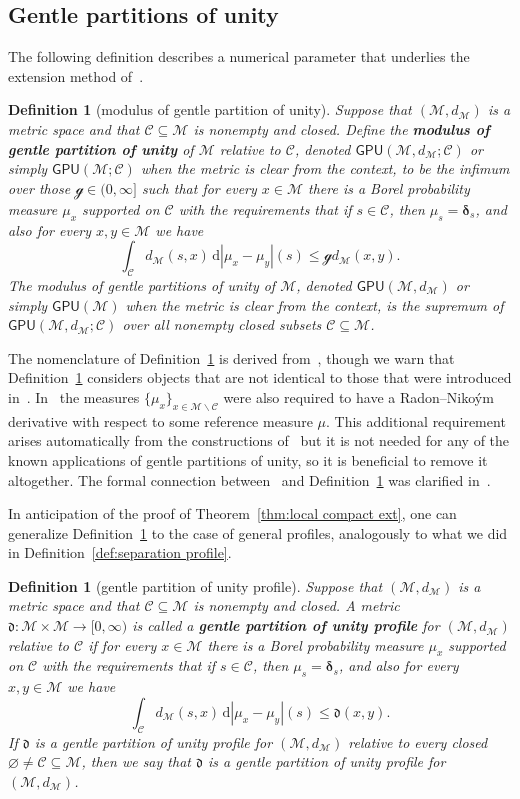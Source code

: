 \documentclass[11pt,reqno]{amsart}
\renewcommand{\le}{\leqslant}
\renewcommand{\setminus}{\smallsetminus}
\newcommand{\ud}[0]{\,\mathrm{d}}
\newcommand{\bd}{\boldsymbol{\delta}}
\renewcommand{\bd}{\boldsymbol{\delta}}
\newtheorem{definition}[theorem]{Definition}
\theoremstyle{remark}
\newcommand{\MM}{\mathcal{M}}
\renewcommand{\subset}{\subseteq}
\renewcommand{\emptyset}{\varnothing}
\newcommand{\sub}{\mathscr{C}}
\renewcommand{\1}{\mathbf 1}
\newcommand{\gpu}{\mathsf{GPU}}
\begin{document}
\subsection{Gentle partitions of unity}

The following definition describes a numerical parameter that underlies the extension method of~\cite{LN05}.
\begin{definition}[modulus of gentle partition of unity]\label{def:gpu} Suppose that $(\MM,d_{\MM})$ is a metric space and that $\sub\subset \MM$ is nonempty and closed. Define  the {\bf \em modulus of gentle partition of unity} of $\MM$ relative to $\sub$, denoted $\gpu(\MM,d_\MM;\sub)$ or simply $\gpu(\MM;\sub)$ when the metric is clear from the context, to be the infimum over those $\mathcal{g}\in (0,\infty]$ such that for every $x\in \MM$ there is a Borel probability measure $\mu_x$ supported on $\sub$ with the requirements that if $s\in \sub$, then $\mu_s=\bd_s$, and also for every $x,y\in \MM$ we have
$$
\int_\sub  d_{\MM}(s,x)\ud|\mu_x-\mu_y|(s)\le \mathcal{g} d_{\MM}(x,y).
$$
The modulus of gentle partitions of unity of $\MM$, denoted $\gpu(\MM,d_{\MM})$ or simply $\gpu(\MM)$ when the metric is clear from the context, is the supremum of $\gpu(\MM,d_\MM;\sub)$ over all nonempty closed subsets $\sub\subset \MM$.
\end{definition}

The nomenclature of Definition~\ref{def:gpu} is derived from~\cite{LN05}, though we warn that Definition~\ref{def:gpu}  considers objects that  are not identical to those that were introduced in~\cite{LN05}. In~\cite{LN05} the measures $\{\mu_x\}_{x\in \MM\setminus \sub}$ were also required to have a Radon--Niko\'ym derivative  with respect to some reference measure $\mu$. This additional  requirement arises automatically from the constructions of~\cite{LN05} but it is not needed for any of the known applications of gentle partitions of unity, so  it is beneficial to remove it altogether. The formal connection between~\cite{LN05} and Definition~\ref{def:gpu}  was clarified  in~\cite{AP20}.


In anticipation of the proof of Theorem~\ref{thm:local compact ext}, one   can generalize Definition~\ref{def:gpu}  to the case of general profiles, analogously to what we did in Definition~\ref{def:separation profile}.

\begin{definition}[gentle partition of unity profile]\label{def:gpu profile} Suppose that $(\MM,d_{\MM})$ is a metric space and that $\sub\subset \MM$ is nonempty and closed. A metric $\mathfrak{d}:\MM\times \MM\to [0,\infty)$ is called a {\bf \em gentle partition of unity profile} for $(\MM,d_\MM)$ relative to $\sub$ if for every $x\in \MM$ there is a Borel probability measure $\mu_x$ supported on $\sub$  with the requirements that if $s\in \sub$, then $\mu_s=\bd_s$, and also for every $x,y\in \MM$ we have
$$
\int_\sub  d_{\MM}(s,x)\ud|\mu_x-\mu_y|(s)\le \mathfrak{d}(x,y).
$$
If $\mathfrak{d}$ is a gentle partition of unity profile for $(\MM,d_\MM)$ relative to every closed $\emptyset\neq \sub\subset \MM$, then we say that $\mathfrak{d}$ is a gentle partition of unity profile for $(\MM,d_\MM)$.
\end{definition}
\end{document}
